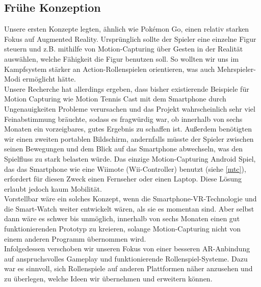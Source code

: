 \documentclass[extern,palatino]{cgBA}
\begin{document}
\subsection{Frühe Konzeption}
Unsere ersten Konzepte legten, ähnlich wie Pokémon Go, einen relativ starken Fokus auf Augmented Reality. Ursprünglich sollte der Spieler eine einzelne Figur steuern und z.B. mithilfe von Motion-Capturing über Gesten in der Realität auswählen, welche Fähigkeit die Figur benutzen soll. So wollten wir uns im Kampfsystem stärker an Action-Rollenspielen orientieren, was auch Mehrspieler-Modi ermöglicht hätte.
\\Unsere Recherche hat allerdings ergeben, dass bisher existierende Beispiele für Motion Capturing wie Motion Tennis Cast mit dem Smartphone durch Ungenauigkeiten Probleme verursachen und das Projekt wahrscheinlich sehr viel Feinabstimmung bräuchte, sodass es fragwürdig war, ob innerhalb von sechs Monaten ein vorzeigbares, gutes Ergebnis zu schaffen ist. Außerdem benötigten wir einen zweiten portablen Bildschirm, andernfalls müsste der Spieler zwischen seinen Bewegungen und dem Blick auf das Smartphone abwechseln, was den Spielfluss zu stark belasten würde. Das einzige Motion-Capturing Android Spiel, das das Smartphone wie eine Wiimote (Wii-Controller) benutzt (siehe \ref{mtc}), erfordert für diesen Zweck einen Fernseher oder einen Laptop. Diese Lösung erlaubt jedoch kaum Mobilität.
\\Vorstellbar wäre ein solches Konzept, wenn die Smartphone-VR-Technologie und die Smart-Watch weiter entwickelt wären, als sie es momentan sind. Aber selbst dann wäre es schwer bis unmöglich, innerhalb von sechs Monaten einen gut funktionierenden Prototyp zu kreieren, solange Motion-Capturing nicht von einem anderen Programm übernommen wird.
\\Infolgedessen verschoben wir unseren Fokus von einer besseren AR-Anbindung auf anspruchsvolles Gameplay und funktionierende Rollenspiel-Systeme. Dazu war es sinnvoll, sich Rollenspiele auf anderen Plattformen näher anzusehen und zu überlegen, welche Ideen wir übernehmen und erweitern können.
\newpage
\end{document}
